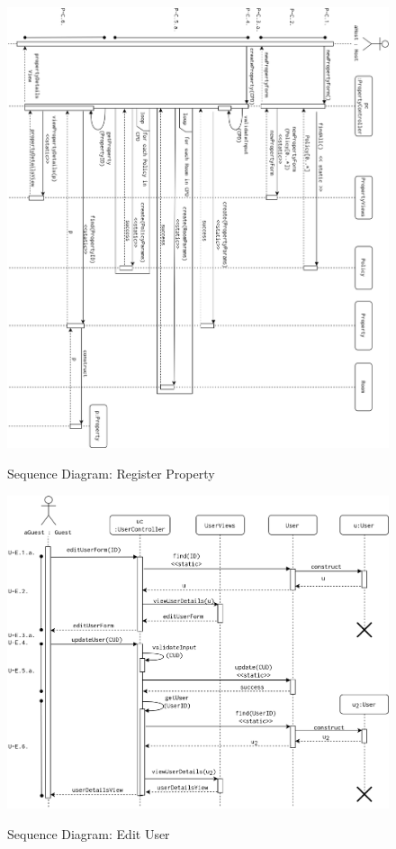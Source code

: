 \begin{figure}[H]
    \centering
    \includegraphics[width=16cm]{img/seq_diagrams/sqd_p_c.png} \\[0.5em]
    \caption{Sequence Diagram: Register Property}
    \label{Sequence Diagram: Register Property}
\end{figure} 

\begin{figure}[H]
    \centering
    \includegraphics[width=13cm]{img/seq_diagrams/sqd_e_u.png} \\[0.5em]
    \caption{Sequence Diagram: Edit User}
    \label{Sequence Diagram: Edit User}
\end{figure}

